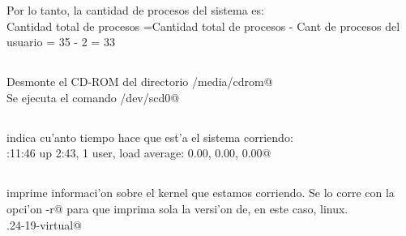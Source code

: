 			Por lo tanto, la cantidad de procesos del sistema es:\\
			Cantidad total de procesos =Cantidad total de procesos - Cant de procesos del usuario =  35 - 2 = 33
		\subsection{}
			Desmonte el CD-ROM del directorio \verb@umount /media/cdrom@\\
			Se ejecuta el comando \verb@umount /dev/scd0@
	  \subsection{}
		  \verb@uptime@ indica cu'anto tiempo hace que est'a el sistema corriendo:\\
		  :11:46 up  2:43,   1 user,   load average: 0.00, 0.00, 0.00@
	  \subsection{}
		  \verb@uname@ imprime informaci'on sobre el kernel que estamos corriendo. Se lo corre con la opci'on \verb@-r@ para que imprima sola la versi'on de, en este caso, linux.\\
		  .24-19-virtual@
